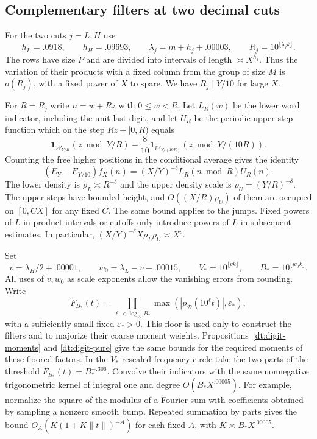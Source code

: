 \documentclass[11pt,a4paper]{article}
\theoremstyle{paperplain}
\numberwithin{equation}{section}
\newcommand{\ind}{\mathbf1}
\begin{document}
\subsection{Complementary filters at two decimal cuts}\label{dt:filters}

For the two cuts \(j=L,H\) use
\begin{equation}\label{dt:cut-parameters}
 h_L=.0918,\qquad h_H=.09693,\qquad
 \lambda_j=m+h_j+.00003,\qquad R_j=10^{\lfloor\lambda_jk\rfloor}.
\end{equation}
The rows have size \(P\) and are divided into intervals of length
\(\asymp X^{h_j}\). Thus the variation of their products with a fixed
column from the group of size \(M\) is \(o(R_j)\), with a fixed power
of \(X\) to spare. We have \(R_j\mid Y/10\) for large \(X\).

For \(R=R_j\) write \(n=w+Rz\) with \(0\le w<R\).
Let \(L_R(w)\) be the lower word indicator, including the unit last
digit, and let \(U_R\) be the periodic upper step function which on
the step \(Rz+[0,R)\) equals
\[
 \ind_{\mathcal W_{Y/R}}(z\bmod Y/R)
       -\frac{8}{10}\ind_{\mathcal W_{Y/(10R)}}(z\bmod Y/(10R)).
\]
Counting the free higher positions in the conditional average gives
the identity
\begin{equation}\label{dt:outer-factor}
 (E_Y-E_{Y/10})f_X(n)=(X/Y)^{-\delta} L_R(n\bmod R)U_R(n).
\end{equation}
The lower density is \(\rho_L\asymp R^{-\delta}\) and the upper
density scale is \(\rho_U=(Y/R)^{-\delta}\).
The upper steps have bounded height, and \(O((X/R)\rho_U)\)
of them are occupied on \([0,CX]\) for any fixed \(C\). The same
bound applies to the jumps. Fixed powers of \(L\) in product
intervals or cutoffs only introduce powers of \(L\) in subsequent
estimates. In particular,
\((X/Y)^{-\delta}X\rho_L\rho_U\asymp X^c\).

Set
\[
 v=\lambda_H/2+.00001,\qquad w_0=\lambda_L-v-.00015,\qquad
 V_*=10^{\lfloor vk\rfloor},\qquad B_*=10^{\lfloor w_0k\rfloor}.
\]
All uses of \(v,w_0\) as scale exponents allow the vanishing errors
from rounding. Write
\[
 \widetilde F_{B_*}(t)=
       \prod_{\ell<\log_{10}B_*}
         \max(|p_{\mathcal D}(10^\ell t)|,\varepsilon_*),
\]
with a sufficiently small fixed \(\varepsilon_*>0\).
This floor is used only to construct the filters and to majorize their
coarse moment weights. Propositions~\ref{dt:digit-moments} and
\ref{dt:digit-pure} give the same bounds for the required moments of
these floored factors. In the \(V_*\)-rescaled
frequency circle take the two parts of the threshold
\(\widetilde F_{B_*}(t)=B_*^{-.306}\).
Convolve their indicators with the same nonnegative trigonometric kernel
of integral one and degree \(O(B_*X^{.00005})\). For example, normalize
the square of the modulus of a Fourier sum with coefficients obtained
by sampling a nonzero smooth bump. Repeated summation by parts gives
the bound \(O_A(K(1+K\|t\|)^{-A})\) for each fixed \(A\), with
\(K\asymp B_*X^{.00005}\).
\end{document}
